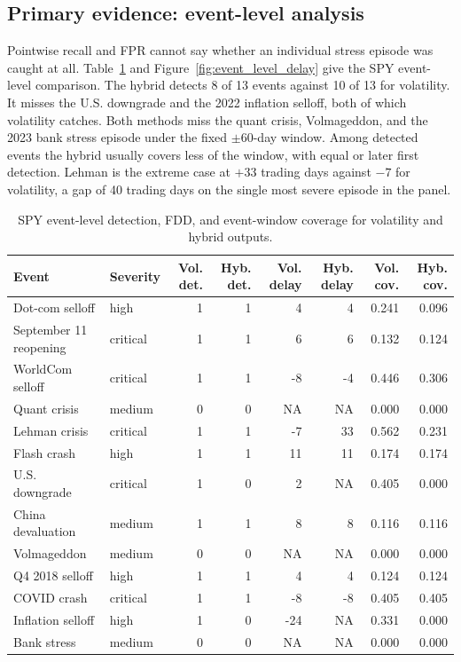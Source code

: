 \documentclass[pdflatex,sn-mathphys-num,iicol]{sn-jnl}
\begin{document}
\subsection{Primary evidence: event-level analysis}
Pointwise recall and FPR cannot say whether an individual stress episode was caught at all. Table~\ref{tab:spy_event_level} and Figure~\ref{fig:event_level_delay} give the SPY event-level comparison. The hybrid detects 8 of 13 events against 10 of 13 for volatility. It misses the U.S. downgrade and the 2022 inflation selloff, both of which volatility catches. Both methods miss the quant crisis, Volmageddon, and the 2023 bank stress episode under the fixed $\pm60$-day window. Among detected events the hybrid usually covers less of the window, with equal or later first detection. Lehman is the extreme case at $+33$ trading days against $-7$ for volatility, a gap of 40 trading days on the single most severe episode in the panel.

\begin{table}[t]
\centering
\caption{SPY event-level detection, FDD, and event-window coverage for volatility and hybrid outputs.}
\label{tab:spy_event_level}
\scriptsize
\begin{tabular}{llrrrrrr}
\toprule
Event & Severity & Vol. det. & Hyb. det. & Vol. delay & Hyb. delay & Vol. cov. & Hyb. cov.\\
\midrule
Dot-com selloff & high & 1 & 1 & 4 & 4 & 0.241 & 0.096\\
September 11 reopening & critical & 1 & 1 & 6 & 6 & 0.132 & 0.124\\
WorldCom selloff & critical & 1 & 1 & -8 & -4 & 0.446 & 0.306\\
Quant crisis & medium & 0 & 0 & NA & NA & 0.000 & 0.000\\
Lehman crisis & critical & 1 & 1 & -7 & 33 & 0.562 & 0.231\\
Flash crash & high & 1 & 1 & 11 & 11 & 0.174 & 0.174\\
U.S. downgrade & critical & 1 & 0 & 2 & NA & 0.405 & 0.000\\
China devaluation & medium & 1 & 1 & 8 & 8 & 0.116 & 0.116\\
Volmageddon & medium & 0 & 0 & NA & NA & 0.000 & 0.000\\
Q4 2018 selloff & high & 1 & 1 & 4 & 4 & 0.124 & 0.124\\
COVID crash & critical & 1 & 1 & -8 & -8 & 0.405 & 0.405\\
Inflation selloff & high & 1 & 0 & -24 & NA & 0.331 & 0.000\\
Bank stress & medium & 0 & 0 & NA & NA & 0.000 & 0.000\\
\bottomrule
\end{tabular}
\end{table}
\end{document}
